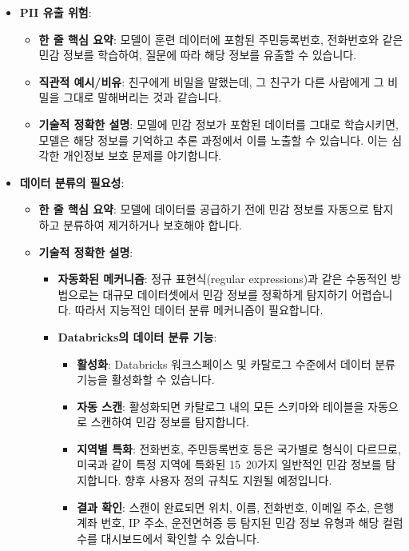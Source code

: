 \documentclass[11pt,a4paper]{article}
\begin{document}
\begin{itemize}
\begin{itemize}
\begin{itemize}
\begin{itemize}
    \item \textbf{PII 유출 위험}:
    \begin{itemize}
        \item \textbf{한 줄 핵심 요약}: 모델이 훈련 데이터에 포함된 주민등록번호, 전화번호와 같은 민감 정보를 학습하여, 질문에 따라 해당 정보를 유출할 수 있습니다.
        \item \textbf{직관적 예시/비유}: 친구에게 비밀을 말했는데, 그 친구가 다른 사람에게 그 비밀을 그대로 말해버리는 것과 같습니다.
        \item \textbf{기술적 정확한 설명}: 모델에 민감 정보가 포함된 데이터를 그대로 학습시키면, 모델은 해당 정보를 기억하고 추론 과정에서 이를 노출할 수 있습니다. 이는 심각한 개인정보 보호 문제를 야기합니다.
    \end{itemize}

    \item \textbf{데이터 분류의 필요성}:
    \begin{itemize}
        \item \textbf{한 줄 핵심 요약}: 모델에 데이터를 공급하기 전에 민감 정보를 자동으로 탐지하고 분류하여 제거하거나 보호해야 합니다.
        \item \textbf{기술적 정확한 설명}:
        \begin{itemize}
            \item \textbf{자동화된 메커니즘}: 정규 표현식(regular expressions)과 같은 수동적인 방법으로는 대규모 데이터셋에서 민감 정보를 정확하게 탐지하기 어렵습니다. 따라서 지능적인 데이터 분류 메커니즘이 필요합니다.
            \item \textbf{Databricks의 데이터 분류 기능}:
            \begin{itemize}
                \item \textbf{활성화}: Databricks 워크스페이스 및 카탈로그 수준에서 데이터 분류 기능을 활성화할 수 있습니다.
                \item \textbf{자동 스캔}: 활성화되면 카탈로그 내의 모든 스키마와 테이블을 자동으로 스캔하여 민감 정보를 탐지합니다.
                \item \textbf{지역별 특화}: 전화번호, 주민등록번호 등은 국가별로 형식이 다르므로, 미국과 같이 특정 지역에 특화된 15~20가지 일반적인 민감 정보를 탐지합니다. 향후 사용자 정의 규칙도 지원될 예정입니다.
                \item \textbf{결과 확인}: 스캔이 완료되면 위치, 이름, 전화번호, 이메일 주소, 은행 계좌 번호, IP 주소, 운전면허증 등 탐지된 민감 정보 유형과 해당 컬럼 수를 대시보드에서 확인할 수 있습니다.
            \end{itemize}
        \end{itemize}
    \end{itemize}


\end{itemize}
\end{itemize}
\end{itemize}
\end{itemize}
\end{document}
